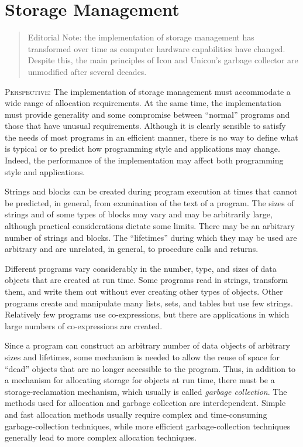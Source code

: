 \chapter{Storage Management}
\label{SM-Chapter}

\begin{quote}
Editorial Note: the implementation of storage management has transformed
over time as computer hardware capabilities have changed. Despite this,
the main principles of Icon and Unicon's garbage collector are
unmodified after several decades.
\end{quote}

\textsc{Perspective}: The implementation of storage management must
accommodate a wide range of allocation requirements.  At the same
time, the implementation must provide generality and some compromise
between ``normal'' programs and those that have unusual
requirements. Although it is clearly sensible to satisfy the needs of
most programs in an efficient manner, there is no way to define what
is typical or to predict how programming style and applications may
change. Indeed, the performance of the implementation may affect both
programming style and applications.

Strings and blocks can be created during program execution at times
that cannot be predicted, in general, from examination of the text of
a program. The sizes of strings and of some types of blocks may vary
and may be arbitrarily large, although practical considerations
dictate some limits. There may be an arbitrary number of strings and
blocks.  The ``lifetimes'' during which they may be used are arbitrary
and are unrelated, in general, to procedure calls and returns.

Different programs vary considerably in the number, type, and sizes of
data objects that are created at run time. Some programs read in
strings, transform them, and write them out without ever creating
other types of objects. Other programs create and manipulate many
lists, sets, and tables but use few strings. Relatively few programs
use co-expressions, but there are applications in which large numbers
of co-expressions are created.

Since a program can construct an arbitrary number of data objects of
arbitrary sizes and lifetimes, some mechanism is needed to allow the
reuse of space for ``dead'' objects that are
no longer accessible to the program. Thus, in addition to a mechanism
for allocating storage for objects at run time, there must be a
storage-reclamation mechanism, which usually is called \textit{garbage
collection}. The methods used for allocation and garbage collection
are interdependent. Simple and fast allocation methods usually require
complex and time-consuming garbage-collection techniques, while more
efficient garbage-collection techniques generally lead to more complex
allocation techniques.

